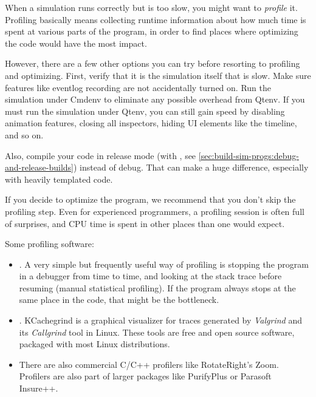 When a simulation runs correctly but is too slow, you might want to
\textit{profile} it. Profiling basically means collecting runtime
information about how much time is spent at various parts of the
program, in order to find places where optimizing the code would
have the most impact.

However, there are a few other options you can try before resorting to profiling
and optimizing. First, verify that it is the simulation itself that is slow.
Make sure features like eventlog recording are not accidentally turned on. Run
the simulation under Cmdenv to eliminate any possible overhead from Qtenv.
If you must run the simulation under Qtenv, you can still gain speed by
disabling animation features, closing all inspectors, hiding UI elements like
the timeline, and so on.

Also, compile your code in release mode (with , see
\ref{sec:build-sim-progs:debug-and-release-builds}) instead of debug. That
can make a huge difference, especially with heavily templated code.

\begin{hint}
If you decide to optimize the program, we recommend that you don't skip the
profiling step. Even for experienced programmers, a profiling session is often
full of surprises, and CPU time is spent in other places than one would
expect.
\end{hint}

Some profiling software:

\begin{itemize}
  \item {}. A very simple but frequently useful way of profiling is
        stopping the program in a debugger from time to time, and looking at the
        stack trace before resuming (manual statistical profiling). If
        the program always stops at the same place in the code, that might be
        the bottleneck.
  \item {}. KCachegrind is a graphical visualizer
        for traces generated by \textit{Valgrind} and its \textit{Callgrind}
        tool in Linux. These tools are free and open source software,
        packaged with most Linux distributions.
  \item There are also commercial C/C++ profilers like RotateRight's Zoom.
        Profilers are also part of larger packages like PurifyPlus or
        Parasoft Insure++.
\end{itemize}


